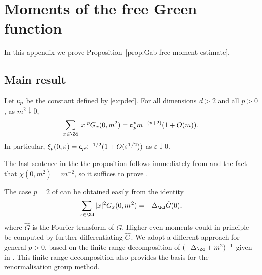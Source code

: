 \chapter{Moments of the free Green function}
\label{app:free-moments}

In this appendix we prove Proposition~\ref{prop:Gab-free-moment-estimate}.


\section{Main result}

\begin{prop}\label{prop:Gab-free-moment-estimate-bis}
Let ${\sf c}_p$ be the constant defined by \eqref{e:cpdef}.
For all dimensions $d>2$ and all $p>0$,
as $m^2 \downarrow 0$,
\begin{equation}
\label{e:Gab-free-moment-estimate-bis}
\sum_{x\in\Zd} |x|^p G_{x}(0, m^2)
=
{\sf c}_p^p m^{-(p + 2)} (1 + O(m)).
\end{equation}
In particular, $\xi_p(0,\varepsilon) = {\sf c}_p \varepsilon^{-1/2}
(1+O(\varepsilon^{1/2}))$ as $\varepsilon \downarrow 0$.
\end{prop}

The last sentence in the the proposition follows immediately from
 and the fact that $\chi(0,m^2)=m^{-2}$,
so it suffices to prove .

The case $p = 2$ of 
can be obtained easily from the identity
\begin{equation}
\sum_{x\in\Zd} |x|^2 G_x(0, m^2) = -\Delta_\Rd \hat{G}(0),
\end{equation}
where $\hat G$ is the Fourier transform of $G$.
Higher even moments could in principle
be computed by further differentiating $\hat G$.
We adopt a different approach
for general $p>0$,
based on the finite range decomposition of $(-\Delta_{\Zd}+m^2)^{-1}$
given in \cite{BGM04,Baue13a}.
This finite range decomposition also provides the basis for the renormalisation group method.


